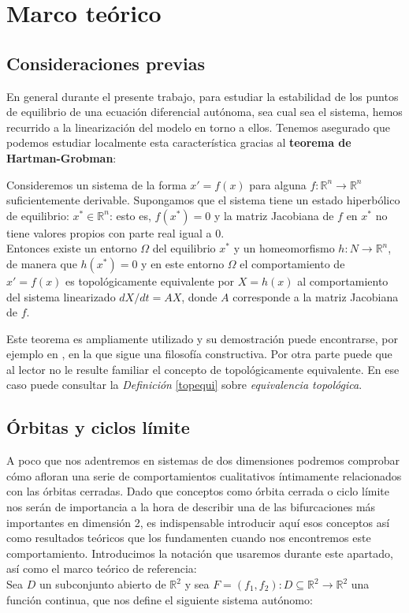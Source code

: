 
\chapter{Marco teórico}

\label{ch:background}

\section{Consideraciones previas}
En general durante el presente trabajo, para estudiar la estabilidad de los puntos de equilibrio de una ecuación diferencial autónoma, sea cual sea el sistema, hemos recurrido a la linearización del modelo en torno a ellos. Tenemos asegurado que podemos estudiar localmente esta característica gracias al \textbf{teorema de Hartman-Grobman}:
\begin{theorem}
	Consideremos un sistema de la forma $x'=f(x)$ para alguna $f: \mathbb{R}^n \to \mathbb{R}^n$ suficientemente derivable.
	Supongamos que el sistema tiene un estado hiperbólico de equilibrio: $x^*\in\mathbb R^n$: esto es, $f(x^*)=0$ y la matriz Jacobiana de $f$ en $x^*$ no tiene valores propios con parte real igual a 0.\\ Entonces existe un entorno $\Omega$ del equilibrio $x^*$ y un homeomorfismo $h : N \to \mathbb{R}^n$,
	de manera que  $h(x^*)=0$
	y en este entorno $\Omega$ el comportamiento de $x'=f(x)$ es topológicamente equivalente por $X=h(x)$ al comportamiento del sistema linearizado $dX/dt=AX$, donde $A$ corresponde a la matriz Jacobiana de $f$. 
	\end{theorem}

Este teorema es ampliamente utilizado y su demostración puede encontrarse, por ejemplo en \cite{perko}, en la que sigue una filosofía constructiva. Por otra parte puede que al lector no le resulte familiar el concepto de topológicamente equivalente. En ese caso puede consultar la \emph{Definición} \ref{topequi} sobre \emph{equivalencia topológica}.

\section{Órbitas y ciclos límite}
A poco que nos adentremos en sistemas de dos dimensiones podremos comprobar cómo afloran una serie de comportamientos cualitativos íntimamente relacionados con las órbitas cerradas. Dado que conceptos como órbita cerrada o ciclo límite nos serán de importancia a la hora de describir una de las bifurcaciones más importantes en dimensión 2, es indispensable introducir aquí esos conceptos así como resultados teóricos que los fundamenten cuando nos encontremos este comportamiento.
Introducimos  la notación que usaremos durante este apartado, así como el marco teórico de referencia:\\
Sea $D$ un subconjunto abierto de $\mathbb{R}^2$ y sea $F=(f_1,f_2):D\subseteq \mathbb{R}^2 \rightarrow \mathbb{R}^2 $ una función continua, que nos define el siguiente sistema autónomo:

